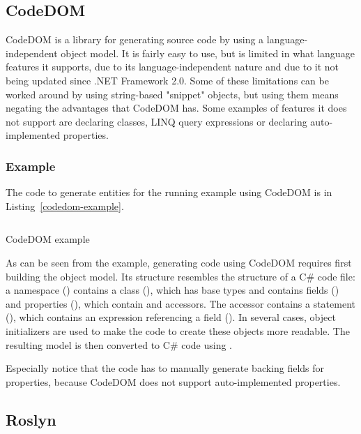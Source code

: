\subsection{CodeDOM}

\ac{CodeDOM} \cite{codedom} is a library for generating source code by using a language-independent object model. It is fairly easy to use, but is limited in what language features it supports, due to its language-independent nature and due to it not being updated since .NET Framework 2.0. Some of these limitations can be worked around by using string-based "snippet" objects, but using them means negating the advantages that CodeDOM has. Some examples of features it does not support are declaring  classes, LINQ query expressions or declaring auto-implemented properties.

\subsubsection{Example}

The code to generate entities for the running example using CodeDOM is in Listing~\ref{codedom-example}.

\begin{listing}
\inputminted[firstline=13,lastline=60]{csharp}{samples/CodeDOM/Program.cs}
\caption{CodeDOM example}
\label{codedom-example}
\end{listing}

As can be seen from the example, generating code using \ac{CodeDOM} requires first building the object model. Its structure resembles the structure of a C\# code file: a namespace () contains a class (), which has base types and contains fields () and properties (), which contain  and  accessors. The  accessor contains a  statement (), which contains an expression referencing a field (). In several cases, object initializers are used to make the code to create these objects more readable. The resulting model is then converted to C\# code using .

Especially notice that the code has to manually generate backing fields for properties, because CodeDOM does not support auto-implemented properties.

\subsection{Roslyn}
\label{roslyn}

